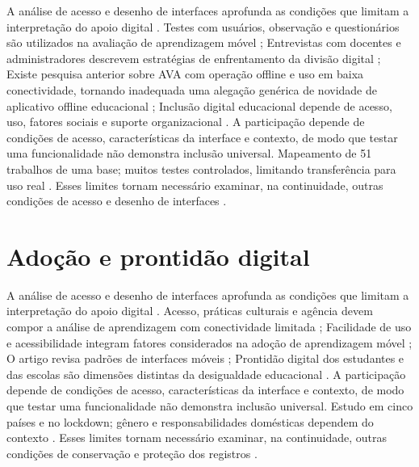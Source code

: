 A análise de acesso e desenho de interfaces aprofunda as condições que limitam a interpretação do apoio digital \citep{kumarmapping2024} \citep{kumiyeboah2023} \citep{linhalis2026} \citep{martin2024}. Testes com usuários, observação e questionários são utilizados na avaliação de aprendizagem móvel \citep{kumarmapping2024}; Entrevistas com docentes e administradores descrevem estratégias de enfrentamento da divisão digital \citep{kumiyeboah2023}; Existe pesquisa anterior sobre AVA com operação offline e uso em baixa conectividade, tornando inadequada uma alegação genérica de novidade de aplicativo offline educacional \citep{linhalis2026}; Inclusão digital educacional depende de acesso, uso, fatores sociais e suporte organizacional \citep{martin2024}. A participação depende de condições de acesso, características da interface e contexto, de modo que testar uma funcionalidade não demonstra inclusão universal. Mapeamento de 51 trabalhos de uma base; muitos testes controlados, limitando transferência para uso real \citep{kumarmapping2024} \citep{kumiyeboah2023} \citep{linhalis2026} \citep{martin2024}. Esses limites tornam necessário examinar, na continuidade, outras condições de acesso e desenho de interfaces \citep{kumarmapping2024} \citep{kumiyeboah2023} \citep{linhalis2026} \citep{martin2024}.

\clearpage\section{Adoção e prontidão digital}

A análise de acesso e desenho de interfaces aprofunda as condições que limitam a interpretação do apoio digital \citep{mathrani2021} \citep{naveed2023} \citep{punchoojit2017} \citep{werfhorst2022}. Acesso, práticas culturais e agência devem compor a análise de aprendizagem com conectividade limitada \citep{mathrani2021}; Facilidade de uso e acessibilidade integram fatores considerados na adoção de aprendizagem móvel \citep{naveed2023}; O artigo revisa padrões de interfaces móveis \citep{punchoojit2017}; Prontidão digital dos estudantes e das escolas são dimensões distintas da desigualdade educacional \citep{werfhorst2022}. A participação depende de condições de acesso, características da interface e contexto, de modo que testar uma funcionalidade não demonstra inclusão universal. Estudo em cinco países e no lockdown; gênero e responsabilidades domésticas dependem do contexto \citep{mathrani2021} \citep{naveed2023} \citep{punchoojit2017} \citep{werfhorst2022}. Esses limites tornam necessário examinar, na continuidade, outras condições de conservação e proteção dos registros \citep{mathrani2021} \citep{naveed2023} \citep{punchoojit2017} \citep{werfhorst2022}.

